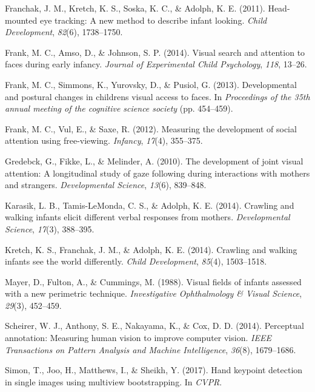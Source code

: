 \documentclass[10pt, letterpaper]{article}
\begin{document}
\hypertarget{ref-franchak2011}{}
Franchak, J. M., Kretch, K. S., Soska, K. C., \& Adolph, K. E. (2011).
Head-mounted eye tracking: A new method to describe infant looking.
\emph{Child Development}, \emph{82}(6), 1738--1750.

\hypertarget{ref-frank2014visual}{}
Frank, M. C., Amso, D., \& Johnson, S. P. (2014). Visual search and
attention to faces during early infancy. \emph{Journal of Experimental
Child Psychology}, \emph{118}, 13--26.

\hypertarget{ref-frank2013}{}
Frank, M. C., Simmons, K., Yurovsky, D., \& Pusiol, G. (2013).
Developmental and postural changes in childrens visual access to faces.
In \emph{Proceedings of the 35th annual meeting of the cognitive science
society} (pp. 454--459).

\hypertarget{ref-frank2012measuring}{}
Frank, M. C., Vul, E., \& Saxe, R. (2012). Measuring the development of
social attention using free-viewing. \emph{Infancy}, \emph{17}(4),
355--375.

\hypertarget{ref-gredeback2010development}{}
Gredebck, G., Fikke, L., \& Melinder, A. (2010). The
development of joint visual attention: A longitudinal study of gaze
following during interactions with mothers and strangers.
\emph{Developmental Science}, \emph{13}(6), 839--848.

\hypertarget{ref-karasik2014}{}
Karasik, L. B., Tamis-LeMonda, C. S., \& Adolph, K. E. (2014). Crawling
and walking infants elicit different verbal responses from mothers.
\emph{Developmental Science}, \emph{17}(3), 388--395.

\hypertarget{ref-kretch2014}{}
Kretch, K. S., Franchak, J. M., \& Adolph, K. E. (2014). Crawling and
walking infants see the world differently. \emph{Child Development},
\emph{85}(4), 1503--1518.

\hypertarget{ref-mayer1988}{}
Mayer, D., Fulton, A., \& Cummings, M. (1988). Visual fields of infants
assessed with a new perimetric technique. \emph{Investigative
Ophthalmology \& Visual Science}, \emph{29}(3), 452--459.

\hypertarget{ref-scheirer2014perceptual}{}
Scheirer, W. J., Anthony, S. E., Nakayama, K., \& Cox, D. D. (2014).
Perceptual annotation: Measuring human vision to improve computer
vision. \emph{IEEE Transactions on Pattern Analysis and Machine
Intelligence}, \emph{36}(8), 1679--1686.

\hypertarget{ref-simon2017hand}{}
Simon, T., Joo, H., Matthews, I., \& Sheikh, Y. (2017). Hand keypoint
detection in single images using multiview bootstrapping. In
\emph{CVPR}.
\end{document}
